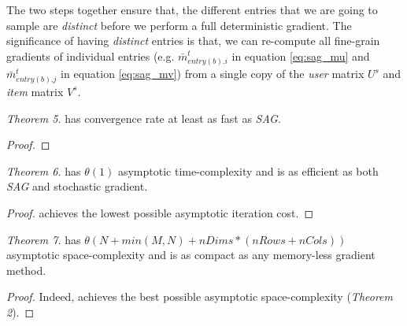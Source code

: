 The two steps together ensure that, the different entries that we are going to sample are \emph{distinct} before we perform a full deterministic gradient.
The significance of having \emph{distinct} entries is that, 
we can re-compute all fine-grain gradients of individual entries (e.g. $\bar{m}_{entry(b).i}^{t}$ in equation \ref{eq:sag_mu} and $\bar{m}_{entry(b).j}^{t}$ in equation \ref{eq:sag_mv}) 
from a single copy of the \emph{user} matrix $U^{s}$ and \emph{item} matrix $V^{s}$.


\emph{Theorem 5.}
\tool has convergence rate at least as fast as \emph{SAG}.
\begin{proof}

\end{proof}


\emph{Theorem 6.}
\tool has $\theta(1)$ asymptotic time-complexity and is as efficient as both \emph{SAG} and stochastic gradient.
\begin{proof}
\tool achieves the lowest possible asymptotic iteration cost.
\end{proof}


\emph{Theorem 7.}
\tool has $\theta(N + min(M,N) + nDims*(nRows+nCols))$ asymptotic space-complexity and is as compact as any memory-less gradient method.
\begin{proof}
Indeed, \tool achieves the best possible asymptotic space-complexity (\emph{Theorem 2}).
\end{proof}
